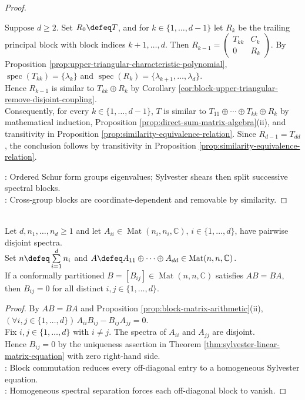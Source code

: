 \begin{theorem}
\begin{proof}
\begin{enumerate}[label=(\roman*)]
Suppose $d\geq2$. Set $R_0\defeq T$, and for $k\in\{1,\ldots,d-1\}$ let $R_k$ be the trailing principal block with block indices $k+1,\ldots,d$. Then $R_{k-1}=\left(\begin{smallmatrix}T_{kk}&C_k\\0&R_k\end{smallmatrix}\right)$. By Proposition \ref{prop:upper-triangular-characteristic-polynomial}, $\operatorname{spec}(T_{kk})=\{\lambda_k\}$ and $\operatorname{spec}(R_k)=\{\lambda_{k+1},\ldots,\lambda_d\}$.\\
Hence $R_{k-1}$ is similar to $T_{kk}\oplus R_k$ by Corollary \ref{cor:block-upper-triangular-remove-disjoint-coupling}.\\
Consequently, for every $k\in\{1,\ldots,d-1\}$, $T$ is similar to $T_{11}\oplus\cdots\oplus T_{kk}\oplus R_k$ by mathematical induction, Proposition \ref{prop:direct-sum-matrix-algebra}(ii), and transitivity in Proposition \ref{prop:similarity-equivalence-relation}. Since $R_{d-1}=T_{dd}$, the conclusion follows by transitivity in Proposition \ref{prop:similarity-equivalence-relation}.
\end{enumerate}
: Ordered Schur form groups eigenvalues; Sylvester shears then split successive spectral blocks.\\
: Cross-group blocks are coordinate-dependent and removable by similarity.
\end{proof}
\end{theorem}

\begin{corollary} \label{cor:commuting-with-disjoint-blocks-has-zero-off-diagonal-blocks} \\
Let $d,n_1,\ldots,n_d\geq1$ and let $A_{ii}\in\operatorname{Mat}(n_i,n_i,\mathbb{C})$, $i\in\{1,\ldots,d\}$, have pairwise disjoint spectra.\\
Set $n\defeq\sum\limits_{i=1}^{d}n_i$ and $A\defeq A_{11}\oplus\cdots\oplus A_{dd}\in\operatorname{Mat}(n,n,\mathbb{C})$.\\
If a conformally partitioned $B=[B_{ij}]\in\operatorname{Mat}(n,n,\mathbb{C})$ satisfies $AB=BA$, then $B_{ij}=0$ for all distinct $i,j\in\{1,\ldots,d\}$.
\begin{proof}
By $AB=BA$ and Proposition \ref{prop:block-matrix-arithmetic}(ii), $(\forall i,j\in\{1,\ldots,d\})\,A_{ii}B_{ij}-B_{ij}A_{jj}=0$.\\
Fix $i,j\in\{1,\ldots,d\}$ with $i\neq j$. The spectra of $A_{ii}$ and $A_{jj}$ are disjoint.\\
Hence $B_{ij}=0$ by the uniqueness assertion in Theorem \ref{thm:sylvester-linear-matrix-equation} with zero right-hand side.\\
: Block commutation reduces every off-diagonal entry to a homogeneous Sylvester equation.\\
: Homogeneous spectral separation forces each off-diagonal block to vanish.
\end{proof}
\end{corollary}
